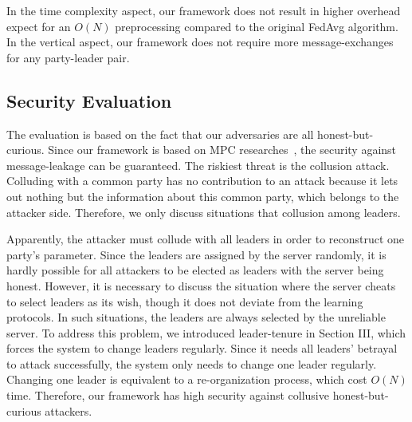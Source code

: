 In the time complexity aspect, our framework does not result in higher overhead expect for an $O(N)$ preprocessing compared to the original FedAvg algorithm. In the vertical aspect, our framework does not require more message-exchanges for any party-leader pair. 

\subsection{Security Evaluation}
The evaluation is based on the fact that our adversaries are all honest-but-curious. Since our framework is based on MPC researches~\cite{Shamir,Du2001SecureMC,Three-Party}, the security against message-leakage can be guaranteed. The riskiest threat is the collusion attack. Colluding with a common party has no contribution to an attack because it lets out nothing but the information about this common party, which belongs to the attacker side. Therefore, we only discuss situations that collusion among leaders. 

Apparently, the attacker must collude with all leaders in order to reconstruct one party's parameter. Since the leaders are assigned by the server randomly, it is hardly possible for all attackers to be elected as leaders with the server being honest. However, it is necessary to discuss the situation where the server cheats to select leaders as its wish, though it does not deviate from the learning protocols. In such situations, the leaders are always selected by the unreliable server. To address this problem, we introduced leader-tenure in Section III, which forces the system to change leaders regularly. Since it needs all leaders' betrayal to attack successfully, the system only needs to change one leader regularly. Changing one leader is equivalent to a re-organization process, which cost $O(N)$ time. Therefore, our framework has high security against collusive honest-but-curious attackers.
